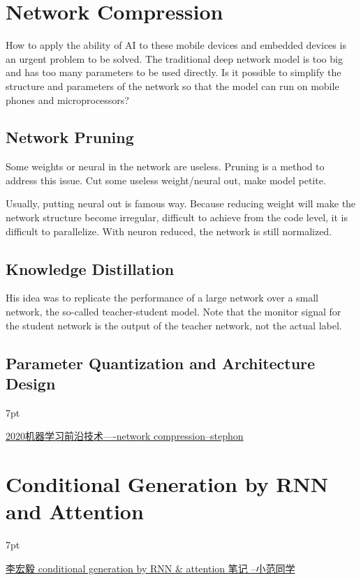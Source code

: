 \documentclass{article}
\newenvironment{quoteblock}{%
\def\FrameCommand{%
\hspace{1pt}%
{\color{DarkBlue}\vrule width 2pt}%
{\color{formalshade}\vrule width 4pt}%
\colorbox{formalshade}%
}%
\MakeFramed{\advance\hsize-\width\FrameRestore}%
\noindent\hspace{-4.55pt}%
\begin{adjustwidth}{}{7pt}%
\vspace{2pt}\vspace{2pt}%
}
{%
\vspace{2pt}\end{adjustwidth}\endMakeFramed%
}
\begin{document}
\section{Network Compression}

How to apply the ability of AI to these mobile devices and embedded devices is an urgent problem to be solved. The traditional deep network model is too big and has too many parameters to be used directly. Is it possible to simplify the structure and parameters of the network so that the model can run on mobile phones and microprocessors?

\subsection{Network Pruning}

Some weights or neural in the network are useless. Pruning is a method to address this issue. Cut some useless weight/neural out, make model petite. 

Usually, putting neural out is famous way. Because reducing weight will make the network structure become irregular, difficult to achieve from the code level, it is difficult to parallelize. With neuron reduced, the network is still normalized.

\subsection{Knowledge Distillation}

His idea was to replicate the performance of a large network over a small network, the so-called teacher-student model. Note that the monitor signal for the student network is the output of the teacher network, not the actual label.

\subsection{Parameter Quantization and Architecture Design}

\begin{quoteblock}
    \href{https://zhuanlan.zhihu.com/p/122977022}{2020机器学习前沿技术----network compression--stephon}
\end{quoteblock}

\section{Conditional Generation by RNN and Attention}

\begin{quoteblock}
    \href{https://zhuanlan.zhihu.com/p/388521961}{李宏毅 conditional generation by RNN \& attention 笔记
--小范同学}
\end{quoteblock}
\end{document}
